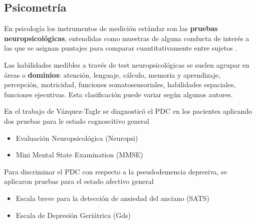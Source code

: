 
\subsection{Psicometría}

En psicología los instrumentos de medición estándar son las \textbf{pruebas neuropsicológicas}, 
entendidas como muestras de alguna conducta de interés a las que se asignan puntajes para comparar 
cuantitativamente entre sujetos \cite{Ardila12}.

Las habilidades medibles a través de test neuropsicológicas se suelen agrupar en áreas o 
\textbf{dominios}: atención, lenguaje, cálculo, memoria y aprendizaje, percepción, motricidad, 
funciones somatosensoriales, habilidades espaciales, funciones ejecutivas. Esta clasificación puede
variar según algunos autores.
%
%

En el trabajo de Vázquez-Tagle \cite{VazquezTagle16} se diagnosticó el PDC en los pacientes 
aplicando dos pruebas para le estado cognoscitivo general
%
\begin{itemize}
\item {Evaluaci\'on Neuropsicol\'ogica (Neuropsi)} \cite{Solis03}
\item {Mini Mental State Examination (MMSE)} \cite{Velasco15}
\end{itemize}
%

Para discriminar el PDC con respecto a la pseudodemencia depresiva, se aplicaron pruebas para el
estado afectivo general
%
\begin{itemize}
\item {Escala breve para la detecci\'on de ansiedad del anciano (SATS)} \cite{Vargas11}
\item {Escala de Depresi\'on Geri\'atrica (Gds)} \cite{Greenberg12,Cuijpers13}
\end{itemize}

